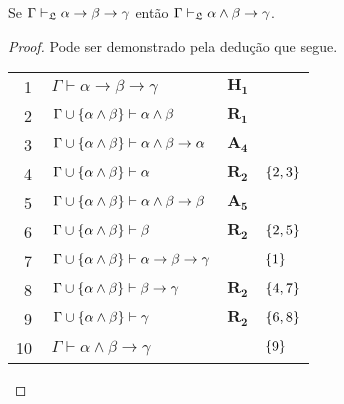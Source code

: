 \vspace{\baselineskip}
\begin{tcolorbox}[enhanced jigsaw, breakable, sharp corners, colframe=black, colback=white, boxrule=0.5pt, left=1.5mm, right=1.5mm, top=1.5mm, bottom=1.5mm]
    \begin{lemma}[Importação]\label{importation}
        Se $\Gamma\mathrel{\vdash}_\mathfrak{L}\alpha\to\beta\to\gamma$ então $\Gamma\mathrel{\vdash}_\mathfrak{L}\alpha\wedge\beta\to\gamma$.
        \begin{proof}
        Pode ser demonstrado pela dedução que segue.

        \vspace{0.5\baselineskip}
        \footnotesize
        \setlength{\rowskip}{0.5\baselineskip}
        \begin{xltabular}{\textwidth}{r | X l l}
            \scriptsize{\phantom{0}1}\phantom{ } & $\ \Gamma\vdash\alpha\to\beta\to\gamma$                               & $\mathbf{H_1}$\phantom{1}                & \\[\rowskip]
            \scriptsize{\phantom{0}2}\phantom{ } & $\ \Gamma\cup\set{\alpha\wedge\beta}\vdash\alpha\wedge\beta$          & $\hyperref[modal.rule.1]{\mathbf{R_1}}$  & \\[\rowskip]
            \scriptsize{\phantom{0}3}\phantom{ } & $\ \Gamma\cup\set{\alpha\wedge\beta}\vdash\alpha\wedge\beta\to\alpha$ & $\hyperref[modal.axiom.4]{\mathbf{A_4}}$ & \\[\rowskip]
            \scriptsize{\phantom{0}4}\phantom{ } & $\ \Gamma\cup\set{\alpha\wedge\beta}\vdash\alpha$                     & $\hyperref[modal.rule.2]{\mathbf{R_2}}$  & $\left\{2,3\right\}$\\[\rowskip]
            \scriptsize{\phantom{0}5}\phantom{ } & $\ \Gamma\cup\set{\alpha\wedge\beta}\vdash\alpha\wedge\beta\to\beta$  & $\hyperref[modal.axiom.5]{\mathbf{A_5}}$ & \\[\rowskip]
            \scriptsize{\phantom{0}6}\phantom{ } & $\ \Gamma\cup\set{\alpha\wedge\beta}\vdash\beta$                      & $\hyperref[modal.rule.2]{\mathbf{R_2}}$  & $\left\{2,5\right\}$\\[\rowskip]
            \scriptsize{\phantom{0}7}\phantom{ } & $\ \Gamma\cup\set{\alpha\wedge\beta}\vdash\alpha\to\beta\to\gamma$    &                      & $\left\{1\right\}$\\[\rowskip]
            \scriptsize{\phantom{0}8}\phantom{ } & $\ \Gamma\cup\set{\alpha\wedge\beta}\vdash\beta\to\gamma$             & $\hyperref[modal.rule.2]{\mathbf{R_2}}$  & $\left\{4,7\right\}$\\[\rowskip]
            \scriptsize{\phantom{0}9}\phantom{ } & $\ \Gamma\cup\set{\alpha\wedge\beta}\vdash\gamma$                     & $\hyperref[modal.rule.2]{\mathbf{R_2}}$  & $\left\{6,8\right\}$\\[\rowskip]
            \scriptsize{10}\phantom{ }           & $\ \Gamma\vdash\alpha\wedge\beta\to\gamma$                            &                      & $\left\{9\right\}$
        \end{xltabular}
        \normalsize


\end{proof}
\end{lemma}
\end{tcolorbox}
